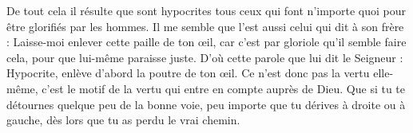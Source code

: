 De tout cela il résulte que sont hypocrites tous ceux qui font n’importe quoi pour être glorifiés par les hommes. Il me semble que l’est aussi celui qui dit à son frère : Laisse-moi enlever cette paille de ton œil, car c’est par gloriole qu’il semble faire cela, pour que lui-même paraisse juste. D’où cette parole que lui dit le Seigneur : Hypocrite, enlève d’abord la poutre de ton œil. Ce n’est donc pas la vertu elle-même, c’est le motif de la vertu qui entre en compte auprès de Dieu. Que si tu te détournes quelque peu de la bonne voie, peu importe que tu dérives à droite ou à gauche, dès lors que tu as perdu le vrai chemin.
